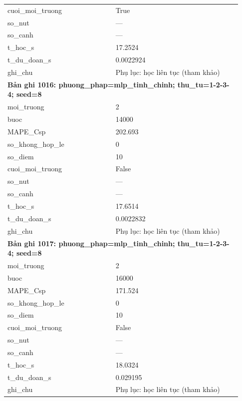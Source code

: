 \begin{longtable}{p{0.43\linewidth}p{0.50\linewidth}}
cuoi\_\allowbreak moi\_\allowbreak truong & True \\
so\_\allowbreak nut & — \\
so\_\allowbreak canh & — \\
t\_\allowbreak hoc\_\allowbreak s & 17.2524 \\
t\_\allowbreak du\_\allowbreak doan\_\allowbreak s & 0.0022924 \\
ghi\_\allowbreak chu & Phụ lục: học liên tục (tham khảo) \\
\midrule
\multicolumn{2}{p{0.95\linewidth}}{\textbf{Bản ghi 1016: phuong\_phap=mlp\_tinh\_chinh; thu\_tu=1-2-3-4; seed=8}} \\
moi\_\allowbreak truong & 2 \\
buoc & 14000 \\
MAPE\_\allowbreak Csp & 202.693 \\
so\_\allowbreak khong\_\allowbreak hop\_\allowbreak le & 0 \\
so\_\allowbreak diem & 10 \\
cuoi\_\allowbreak moi\_\allowbreak truong & False \\
so\_\allowbreak nut & — \\
so\_\allowbreak canh & — \\
t\_\allowbreak hoc\_\allowbreak s & 17.6514 \\
t\_\allowbreak du\_\allowbreak doan\_\allowbreak s & 0.0022832 \\
ghi\_\allowbreak chu & Phụ lục: học liên tục (tham khảo) \\
\midrule
\multicolumn{2}{p{0.95\linewidth}}{\textbf{Bản ghi 1017: phuong\_phap=mlp\_tinh\_chinh; thu\_tu=1-2-3-4; seed=8}} \\
moi\_\allowbreak truong & 2 \\
buoc & 16000 \\
MAPE\_\allowbreak Csp & 171.524 \\
so\_\allowbreak khong\_\allowbreak hop\_\allowbreak le & 0 \\
so\_\allowbreak diem & 10 \\
cuoi\_\allowbreak moi\_\allowbreak truong & False \\
so\_\allowbreak nut & — \\
so\_\allowbreak canh & — \\
t\_\allowbreak hoc\_\allowbreak s & 18.0324 \\
t\_\allowbreak du\_\allowbreak doan\_\allowbreak s & 0.029195 \\
ghi\_\allowbreak chu & Phụ lục: học liên tục (tham khảo) \\

\end{longtable}
